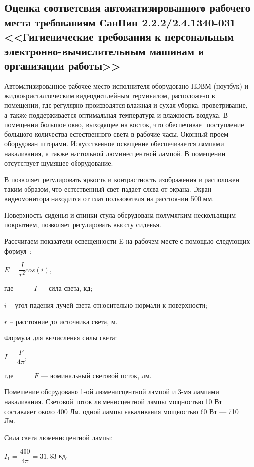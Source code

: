 \subsection{Оценка соответсвия автоматизированного рабочего места требованиям СанПин 2.2.2/2.4.1340-031 <<Гигиенические требования к персональным электронно-вычислительным машинам и организации работы>>}

Автоматизированное рабочее место исполнителя оборудовано ПЭВМ (ноутбук) и жидкокристаллическим 
видеодисплейным терминалом, расположено в помещении, где регулярно производятся влажная 
и сухая уборка, проветривание, а также поддерживается
оптимальная температура и влажность воздуха. В помещении большое окно, выходящее на восток,
что обеспечивает поступление большого количества естественного света в рабочие часы.
Оконный проем оборудован шторами. Искусственное освещение обеспечивается лампами
накаливания, а также настольной люминесцентной лампой. В помещении отсутствует шумящее оборудование.

В позволяет регулировать яркость и контрастность изображения и расположен таким образом, что 
естественный свет падает слева от экрана. Экран видеомонитора 
находится от глаз пользователя на расстоянии 500 мм.

Поверхность сиденья и спинки стула оборудована полумягким нескользящим покрытием, позволяет регулировать
высоту сиденья.


Рассчитаем показатели освещенности E на рабочем месте с помощью следующих формул~\cite{gost_8995}:
\begin{center}
$E = \dfrac{I}{r^{2}}cos(i),$
\end{center}
где~~~~~\ $\textit{I}$ --- сила света, кд;

$\textit{i}$ -- угол падения лучей света относительно нормали к поверхности;

$\textit{r}$ -- расстояние до источника света, м.

Формула для вычисления силы света:
\begin{center}
$I = \dfrac{F}{4\pi},$
\end{center}
где~~~~~\ $\textit{F}$ --- номинальный световой поток, лм.

Помещение оборудовано 1-ой люменисцентной лампой и 3-мя лампами накаливания. 
Световой поток люменисцентной лампы мощностью 10 Вт составляет около 400 Лм, 
одной лампы накаливания мощностью 60 Вт --- 710 Лм.

Сила света люменисцентной лампы:
\begin{center}
$I_{1} = \dfrac{400}{4\pi}= 31,83$ кд.
\end{center}

